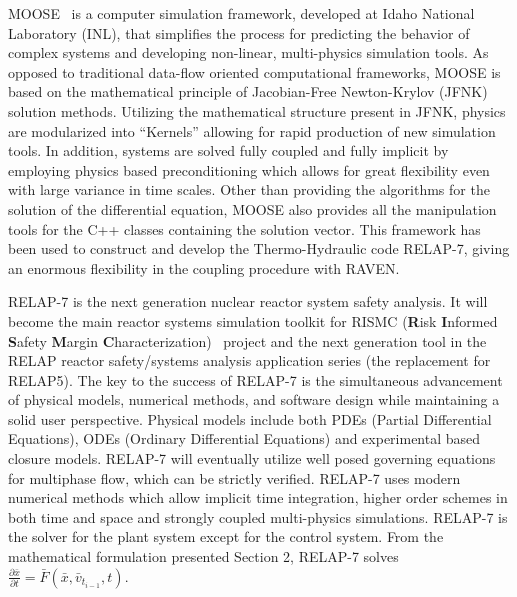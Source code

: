 \documentclass{mc2013}
\begin{document}
\label{sec:MOOSE/RELAP-7}
MOOSE~\cite{MOOSE} is a computer simulation framework,  developed at Idaho National Laboratory (INL), that simplifies the process for predicting the behavior of complex systems and developing non-linear, multi-physics simulation tools. As opposed to traditional data-flow oriented computational frameworks, MOOSE is based on the mathematical principle of Jacobian-Free Newton-Krylov (JFNK) solution methods. Utilizing the mathematical structure present in JFNK, physics are modularized into “Kernels” allowing for rapid production of new simulation tools. In addition, systems are solved fully coupled and fully implicit by employing physics based preconditioning which allows for great flexibility even with large variance in time scales. 
Other than providing the algorithms for the solution of the differential equation, MOOSE also provides all the manipulation tools for the C++ classes containing the solution vector. This framework has been used to construct and develop the Thermo-Hydraulic code RELAP-7, giving an enormous flexibility in the coupling procedure with RAVEN. 

RELAP-7 is the next generation nuclear reactor system safety analysis. It will become the main reactor systems simulation toolkit for RISMC (\textbf{R}isk \textbf{I}nformed \textbf{S}afety \textbf{M}argin \textbf{C}haracterization)~\cite{mandelliANS_RISMC} project and the next generation tool in the RELAP reactor safety/systems analysis application series (the replacement for RELAP5). The key to the success of RELAP-7 is the simultaneous advancement of physical models, numerical methods, and software design while maintaining a solid user perspective. 
Physical models include both PDEs (Partial Differential Equations), ODEs (Ordinary Differential Equations) and experimental based closure models. RELAP-7 will eventually utilize well posed governing equations for multiphase flow, which can be strictly verified. RELAP-7 uses modern numerical methods which allow implicit time integration, higher order schemes in both time and space and strongly coupled multi-physics simulations.
RELAP-7 is the solver for the plant system except for the control system. From the mathematical
formulation presented Section 2, RELAP-7 solves 
$\frac{\partial \bar{x}}{\partial t} = \bar{F}(\bar{x},\bar{v}_{t_{i-1}},t)$.

\end{document}
